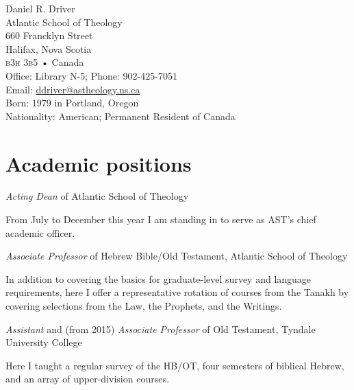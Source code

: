 \documentclass[11pt]{article}
\newcommand{\years}[1]{\marginnote{\footnotesize #1}}
\begin{document}
{\Huge Daniel R. Driver}\\[3em]
%
Atlantic School of Theology\\
660 Francklyn Street\\
Halifax, Nova Scotia\\
\textsc{b3h 3b5} • Canada\\[1em]

%
Office: Library N-5; Phone: 902-425-7051\\
Email: \href{mailto:ddriver@astheology.ns.ca}{ddriver@astheology.ns.ca}\\[1em]
%
Born: 1979 in Portland, Oregon\\
Nationality: American; Permanent Resident of Canada
\vfill

\section*{Academic positions}
\years{2020} \emph{Acting Dean} of Atlantic School of Theology
	\begin{quoting}
	From July to December this year I am standing in to serve as AST's chief academic officer.
	\end{quoting}

\years{2016---} \emph{Associate Professor} of Hebrew Bible/Old Testament, Atlantic School of Theology
	\begin{quoting}
	In addition to covering the basics for graduate-level survey and
	language requirements, here I offer a representative rotation of
	courses from the Tanakh by covering selections from the Law, the
	Prophets, and the Writings.
	\end{quoting}


\years{2008--2016} \emph{Assistant} and (from 2015) \emph{Associate Professor} of Old Testament, Tyndale University College
	\begin{quoting}
	Here I taught a regular survey of the HB/OT, four semesters of
	biblical Hebrew, and an array of upper-division courses.
	\end{quoting}
\end{document}
